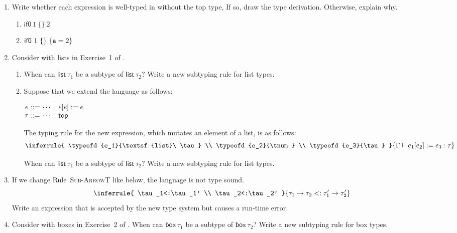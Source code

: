 \begin{enumerate}
\item Write whether each expression is well-typed in \lang without the top type,
If so, draw the type derivation. Otherwise, explain why.
\begin{enumerate}
\item
  $\textsf{if0}\ {1}\ {\{ \}}\ {2}$
\item
  $\textsf{if0}\ {1}\ {\{ \}}\ {\{\code{a}=2\}}$
\end{enumerate}

\item Consider \plang with lists in Exercise~1 of .
  \begin{enumerate}
    \item When can $\textsf{list}\ \tau_1$ be a subtype of $\textsf{list}\
      \tau_2$? Write a new subtyping rule for list types.
    \item Suppose that we extend the language as follows:

      \vspace{0.5em}
      $\begin{array}{@{}r@{~}r@{~}l@{}}
        e & ::= & \cdots\ |\ e[e]:=e \\
        \tau & ::= & \cdots\ |\ \ttop \\
      \end{array}$
      \vspace{0.5em}

      The typing rule for the new expression, which mutates an element of a
      list, is as follows:
      \[
        \inferrule
        { \typeofd{e_1}{\textsf{list}\ \tau} \\
          \typeofd{e_2}{\tnum} \\
          \typeofd{e_3}{\tau}
        }
        { \typeofd{e_1[e_2]:=e_3}{\tau} }
      \]

      When can $\textsf{list}\ \tau_1$ be a subtype of $\textsf{list}\
      \tau_2$? Write a new subtyping rule for list types.
  \end{enumerate}

\item If we change Rule~\textsc{Sub-ArrowT} like below, the language is not type
  sound.
  \[
    \inferrule
    { \tau_1<:\tau_1' \\ \tau_2<:\tau_2' }
    { \tau_1\rightarrow\tau_2<:\tau_1'\rightarrow\tau_2' }
  \]
Write an expression that is accepted by the new type system but
causes a run-time error.

\item Consider \plang with boxes in Exercise~2 of .
  When can $\textsf{box}\ \tau_1$ be a subtype of $\textsf{box}\ \tau_2$?
  Write a new subtyping rule for box types.


\end{enumerate}
